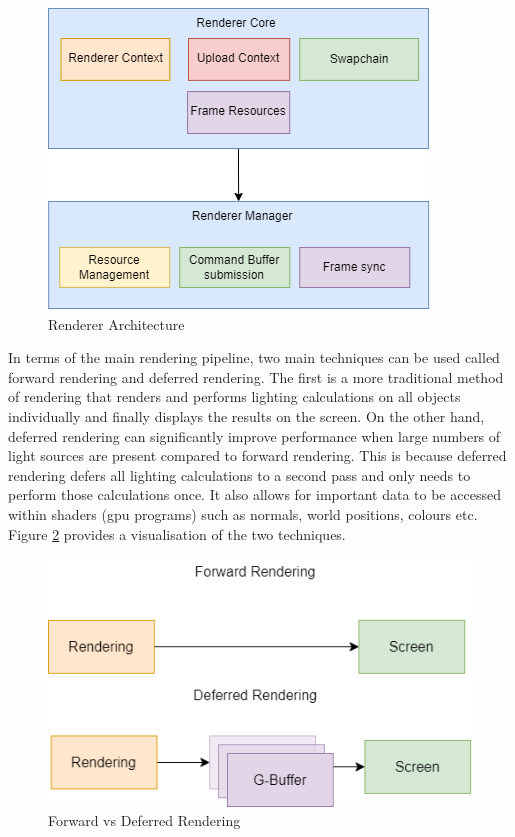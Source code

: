 \documentclass[11pt]{article}
\begin{document}
\begin{figure}[H]
  \centering
  \includegraphics[width=\textwidth]{images/renderer_architecture.png}
  \caption{Renderer Architecture}
  \label{fig:rendererarch}
\end{figure}


In terms of the main rendering pipeline, two main techniques can be used called
forward rendering and deferred rendering. The first is a more traditional method
of rendering that renders and performs lighting calculations on all objects
individually and finally displays the results on the screen. On the other hand,
deferred rendering can significantly improve performance when large numbers of
light sources are present compared to forward rendering. This is because
deferred rendering defers all lighting calculations to a second pass and only
needs to perform those calculations once. It also allows for important data to
be accessed within shaders (\gls*{gpu} programs) such as normals, world
positions, colours etc. Figure \ref{fig:forward_vs_deferred} provides a
visualisation of the two techniques.

\begin{figure}[H]
  \centering
  \includegraphics[width=\textwidth]{images/forward_vs_deferred.png}
  \caption{Forward vs Deferred Rendering}
  \label{fig:forward_vs_deferred}
\end{figure}
\end{document}
